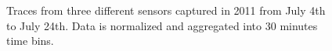 \begin{figure}[t!]
\centering
 \caption{Traces from three different sensors captured in 2011 from July 4th to July 24th. Data is normalized and aggregated into 30 minutes time bins.}
 \label{fig:raw}
\end{figure}




